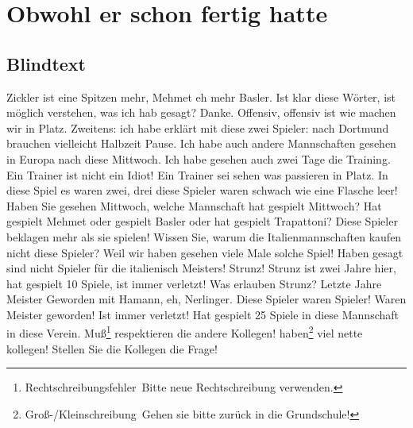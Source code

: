 \section{Obwohl er schon fertig hatte}
\subsection{Blindtext}
Zickler  ist eine Spitzen mehr, Mehmet eh mehr Basler. Ist klar diese Wörter, ist möglich verstehen, was ich hab gesagt? Danke. Offensiv, offensiv ist wie machen wir in Platz. Zweitens: ich habe erklärt mit diese zwei Spieler: nach Dortmund brauchen vielleicht Halbzeit Pause. Ich habe auch andere Mannschaften gesehen in Europa nach diese Mittwoch. Ich habe gesehen auch zwei Tage die Training. Ein Trainer ist nicht ein Idiot! Ein Trainer sei sehen was passieren in Platz. In diese Spiel es waren zwei, drei diese Spieler waren schwach wie eine Flasche leer! Haben Sie gesehen Mittwoch, welche Mannschaft hat gespielt Mittwoch? Hat gespielt Mehmet  oder gespielt Basler oder hat gespielt Trapattoni?
Diese Spieler beklagen mehr als sie spielen! Wissen Sie, warum die Italienmannschaften kaufen nicht diese Spieler? Weil wir haben gesehen viele Male solche Spiel! Haben gesagt sind nicht Spieler für die italienisch Meisters! Strunz! Strunz ist zwei Jahre hier, hat gespielt 10 Spiele, ist immer verletzt! Was erlauben Strunz? Letzte Jahre Meister Geworden mit Hamann, eh, Nerlinger. Diese Spieler waren Spieler! Waren Meister geworden! Ist immer verletzt! Hat gespielt 25 Spiele in diese Mannschaft in diese Verein. Muß\footnote{Rechtschreibungsfehler \frqq\,Bitte neue Rechtschreibung verwenden.} respektieren die andere Kollegen! haben\footnote{Groß-/Kleinschreibung \frqq\,Gehen sie bitte zurück in die Grundschule!} viel nette kollegen! Stellen Sie die Kollegen die Frage!

\clearpage
\printbibliography[heading=subbibliography,title={Literaturverzeichnis},nottype=online]

\clearpage
\printbibliography[heading=subbibliography,title={Quellenverzeichnis},type=online]

\clearpage
{%
\let\oldnumberline\numberline%
\renewcommand{\numberline}{\figurename~\oldnumberline}%
\listoffigures%
}

